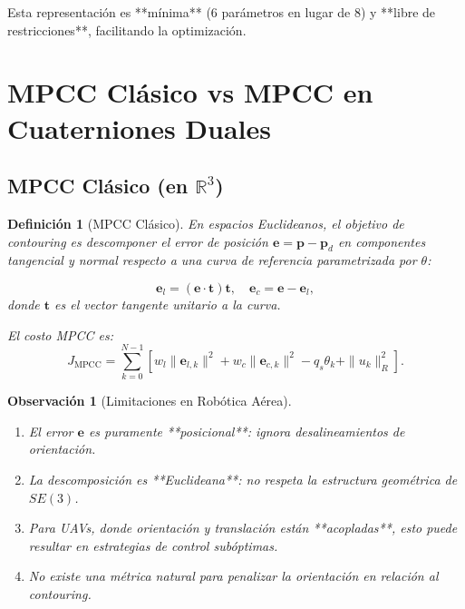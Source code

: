 \documentclass[11pt,a4paper]{article}
\newtheorem{definition}[theorem]{Definición}
\newtheorem{remark}[theorem]{Observación}
\begin{document}
Esta representación es **mínima** (6 parámetros en lugar de 8) y **libre de restricciones**, facilitando la optimización.

\section{MPCC Clásico vs MPCC en Cuaterniones Duales}
\label{sec:mpcc_classical_vs_dual}

\subsection{MPCC Clásico (en $\mathbb{R}^3$)}

\begin{definition}[MPCC Clásico]
En espacios Euclideanos, el objetivo de contouring es descomponer el error de posición $\mathbf{e} = \mathbf{p} - \mathbf{p}_d$ en componentes tangencial y normal respecto a una curva de referencia parametrizada por $\theta$:

\begin{equation}
    \mathbf{e}_l = (\mathbf{e} \cdot \mathbf{t}) \mathbf{t}, \quad \mathbf{e}_c = \mathbf{e} - \mathbf{e}_l,
\end{equation}
donde $\mathbf{t}$ es el vector tangente unitario a la curva.

El costo MPCC es:
\begin{equation}
    J_{\text{MPCC}} = \sum_{k=0}^{N-1} \left[ w_l \|\mathbf{e}_{l,k}\|^2 + w_c \|\mathbf{e}_{c,k}\|^2 - q_s \theta_k + \|u_k\|_R^2 \right].
\end{equation}
\end{definition}

\begin{remark}[Limitaciones en Robótica Aérea]
\begin{enumerate}
    \item El error $\mathbf{e}$ es puramente **posicional**: ignora desalineamientos de orientación.
    \item La descomposición es **Euclideana**: no respeta la estructura geométrica de $SE(3)$.
    \item Para UAVs, donde orientación y translación están **acopladas**, esto puede resultar en estrategias de control subóptimas.
    \item No existe una métrica natural para penalizar la orientación en relación al contouring.
\end{enumerate}
\end{remark}
\end{document}
